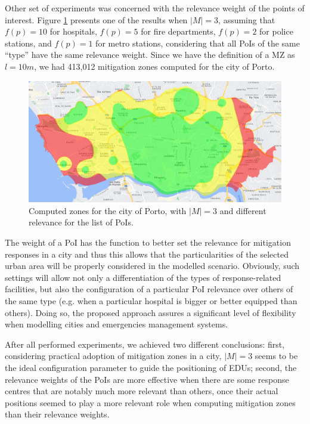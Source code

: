 \begin{refsection}
Other set of experiments was concerned with the relevance weight of the points of interest. Figure \ref{Fig:zones_porto_3_weight} presents one of the results when $|M|=3$, assuming that $f(p)=10$ for hospitals, $f(p)=5$ for fire departments, $f(p)=2$ for police stations, and $f(p)=1$ for metro stations, considering that all PoIs of the same ``type'' have the same relevance weight. Since we have the definition of a MZ as $l = 10m$, we had 413,012 mitigation zones computed for the city of Porto.

\begin{figure}[ht!]
  \centering
  \includegraphics[width=0.9\linewidth]{Chapters/2-EDUs/images/porto_M3.png}
  \caption{Computed zones for the city of Porto, with $|M|=3$ and different relevance for the list of PoIs.}\label{Fig:zones_porto_3_weight}
\end{figure}

The weight of a PoI has the function to better set the relevance for mitigation responses in a city and thus this allows that the particularities of the selected urban area will be properly considered in the modelled scenario. Obviously, such settings will allow not only a differentiation of the types of response-related facilities, but also the configuration of a particular PoI relevance over others of the same type (e.g. when a particular hospital is bigger or better equipped than others). Doing so, the proposed approach assures a significant level of flexibility when modelling cities and emergencies management systems.

After all performed experiments, we achieved two different conclusions: first, considering practical adoption of mitigation zones in a city, $|M|=3$ seems to be the ideal configuration parameter to guide the positioning of EDUs; second, the relevance weights of the PoIs are more effective when there are some response centres that are notably much more relevant than others, once their actual positions seemed to play a more relevant role when computing mitigation zones than their relevance weights.  


\end{refsection}
